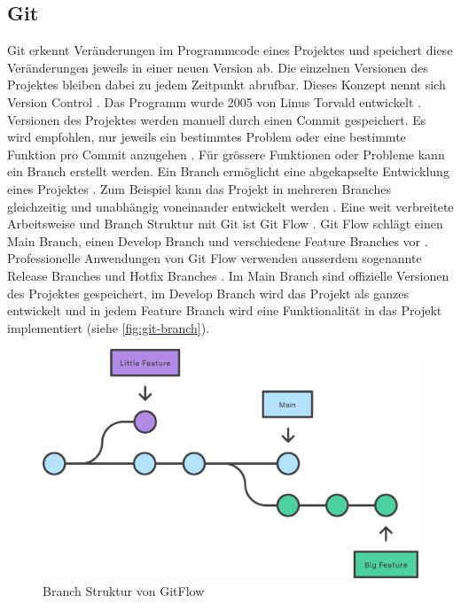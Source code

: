 \subsection{Git}\label{sub:t_git_git} Git erkennt Veränderungen im Programmcode eines
Projektes und speichert diese Veränderungen jeweils in einer neuen Version ab. Die
einzelnen Versionen des Projektes bleiben dabei zu jedem Zeitpunkt abrufbar.
Dieses Konzept nennt sich Version Control
\cite{atlassian_what_nodate}. Das Programm wurde 2005 von Linus
Torvald entwickelt \cite{noauthor_git_2021}. Versionen des Projektes werden
manuell durch einen Commit gespeichert. Es wird empfohlen, nur jeweils ein
bestimmtes Problem oder eine bestimmte Funktion pro Commit anzugehen
\cite{noauthor_5_2019}. Für grössere Funktionen oder Probleme kann ein Branch
erstellt werden. Ein Branch ermöglicht eine abgekapselte Entwicklung eines
Projektes \cite{guillermo_brachetta_what_2022}. Zum Beispiel kann das Projekt in
mehreren Branches gleichzeitig und unabhängig voneinander entwickelt werden
\cite{guillermo_brachetta_what_2022}. Eine weit verbreitete Arbeitsweise und
Branch Struktur mit Git ist Git Flow
\cite{noauthor_what_2022}\cite{atlassian_git-flow-workflow_nodate}. Git Flow
schlägt einen Main Branch, einen Develop Branch und verschiedene
Feature Branches vor \cite{atlassian_git-flow-workflow_nodate}. Professionelle
Anwendungen von Git Flow verwenden ausserdem sogenannte Release Branches und
Hotfix Branches \cite{cameron_mckenzie_gitflow_2021}. Im Main Branch sind
offizielle Versionen des Projektes gespeichert, im Develop Branch wird das
Projekt als ganzes entwickelt und in jedem Feature Branch wird eine
Funktionalität in das Projekt implementiert (siehe \autoref{fig:git-branch}).
 
\begin{figure}[!ht]
   \centering
   \includegraphics[width=\textwidth-2cm]{images/theorie/git-branch.png}
   \caption{Branch Struktur von GitFlow \cite{atlassian_git-flow-workflow_nodate}}\label{fig:git-branch}
\end{figure}
 
